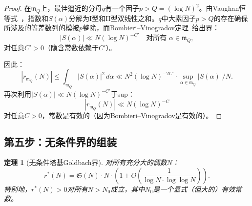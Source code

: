 \documentclass[11pt,a4paper]{article}
\newtheorem{theorem}{定理}[section]
\theoremstyle{remark}
\newcommand{\mm}{\mathfrak{m}}
\begin{document}
\begin{proof}
在$\mm_Q$上，最佳逼近的分母$q$有一个因子$p > Q = (\log N)^2$。由Vaughan恒等式~\cite[第13章]{IwaniecKowalski2004}，指数和$S(\alpha)$分解为I型和II型双线性之和。$q$中大素因子$p > Q$的存在确保所涉及的等差数列的模被$p$整除，而Bombieri--Vinogradov定理~\cite[定理17.1]{IwaniecKowalski2004}给出界：
\begin{equation}
  |S(\alpha)| \ll N(\log N)^{-C'} \quad \text{对所有 } \alpha \in \mm_Q,
\end{equation}
对任意$C' > 0$（隐含常数依赖于$C'$）。

因此：
\begin{equation}
  |r_{\mm_Q}(N)| \leq \int_{\mm_Q}|S(\alpha)|^2\,d\alpha
    \ll N^2(\log N)^{-2C'} \cdot \sup_{\alpha \in \mm_Q}|S(\alpha)|/N.
\end{equation}
再次利用$|S(\alpha)| \ll N(\log N)^{-C'}$于sup：
\begin{equation}
  |r_{\mm_Q}(N)| \ll N(\log N)^{-C}
\end{equation}
对任意$C > 0$，常数是有效的（因为Bombieri--Vinogradov是有效的）。
\end{proof}

\subsection{第五步：无条件界的组装}
\label{subsec:assemble}

\begin{theorem}[无条件塔基Goldbach界]
\label{thm:tower-suppression}
对所有充分大的偶数$N$：
\begin{equation}
\label{eq:unconditional-bound}
  r^*(N) = \mathfrak{S}(N) \cdot N \cdot \left(1 + O\!\left(\frac{1}{\log N \cdot \log\log N}\right)\right).
\end{equation}
特别地，$r^*(N) > 0$对所有$N > N_0$成立，其中$N_0$是一个显式（但大的）有效常数。
\end{theorem}
\end{document}
